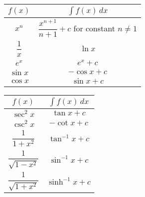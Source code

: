 \documentclass[10pt, a4paper]{article}
\begin{document}
\begin{minipage}{0.55\textwidth}
\centering
\bgroup
\def\setlength{25pt}
\def\arraystretch{2}
\begin{tabular}{|c|c|}
    \hline
    $f(x)$ & $\displaystyle\int f(x)\,dx$ \\
    \hline
    $x ^ n$ & $\dfrac{x ^ {n + 1}}{n + 1} + c$ for constant $n \neq 1$ \\
    \hline
    $\dfrac{1}{x}$ & $\ln{x}$ \\
    \hline
    $e ^ x$ & $e ^ x + c$ \\
    \hline
    $\sin{x}$ & $-\cos{x} + c$ \\
    \hline
    $\cos{x}$ & $\sin{x} + c$ \\
    \hline
\end{tabular}
\egroup
\end{minipage}
\begin{minipage}{0.55\textwidth}
\centering
\bgroup
\def\setlength{25pt}
\def\arraystretch{2}
\begin{tabular}{|c|c|}
    \hline
    $f(x)$ & $\displaystyle\int f(x)\,dx$ \\
    \hline
    $\sec ^ 2 x$ & $\tan x + c$ \\
    \hline
    $\csc ^ 2 x$ & $-\cot x + c$ \\
    \hline
    $\dfrac{1}{1 + x ^ 2}$ & $\tan ^ {-1} x + c$ \\
    \hline
    $\dfrac{1}{\sqrt{1 - x ^ 2}}$ & $\sin ^ {-1} x + c$ \\
    \hline
    $\dfrac{1}{\sqrt{1 + x ^ 2}}$ & $\sinh ^ {-1} x + c$ \\
    \hline
\end{tabular}
\egroup
\end{minipage}
\end{document}
